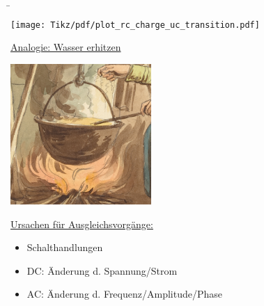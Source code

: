 \begin{frame}
{	%

}%
\b{%
	\begin{minipage}{\textwidth}%
		\begin{minipage}{0.48\textwidth}\centering
		\end{minipage}%
		\begin{minipage}{0.48\textwidth}\centering
			\texttt{[image: Tikz/pdf/plot\_rc\_charge\_uc\_transition.pdf]}
		\end{minipage}
	\end{minipage}
	\vspace{0.5cm}
	\pause

	\begin{minipage}{\textwidth}%
		\begin{minipage}[t]{0.48\textwidth}\centering
			\underline{Analogie: Wasser erhitzen}\footnotemark
			\vspace{2mm}

			\includegraphics[width=0.4\textwidth]{Bilder/Ausschnitt_A_Peasant_Family_Cooking_over_a_Campfire_by_Bartolomeo_Pinelli_CC0_1.0.png}%
			\pause
		\end{minipage}%
		\begin{minipage}[t]{0.48\textwidth}%
			\underline{Ursachen für Ausgleichsvorgänge:}
			\vspace{2mm}
			\begin{itemize}
				\item Schalthandlungen
				\item DC: Änderung d. Spannung/Strom
				\item AC: Änderung d. Frequenz/Amplitude/Phase
			\end{itemize}
		\end{minipage}
	\end{minipage}
}
\end{frame}

